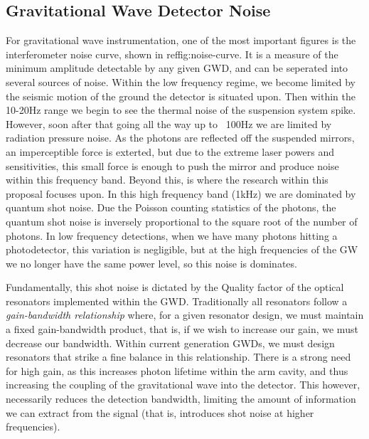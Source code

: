 \documentclass[aps,
                pra,  
                a4paper, 
                amsmath, 
                amssymb, 
                preprint,
                amsfonts,
                nofootinbib,
                titlepage
            ]{revtex4-2}
\begin{document}
    \subsection{Gravitational Wave Detector Noise}
    \label{sec:gwd-noise}
    For gravitational wave instrumentation, one of the most important figures is the interferometer noise curve, shown in ref{fig:noise-curve}. It is a measure of the minimum amplitude detectable by any given GWD, and can be seperated into several sources of noise. Within the low frequency regime, we become limited by the seismic motion of the ground the detector is situated upon. Then within the 10-20Hz range we begin to see the thermal noise of the suspension system spike. However, soon after that going all the way up to ~100Hz we are limited by radiation pressure noise. As the photons are reflected off the suspended mirrors, an imperceptible force is exterted, but due to the extreme laser powers and sensitivities, this small force is enough to push the mirror and produce noise within this frequency band. Beyond this, is where the research within this proposal focuses upon. In this high frequency band (1kHz) we are dominated by quantum shot noise. Due the Poisson counting statistics of the photons, the quantum shot noise is inversely proportional to the square root of the number of photons. In low frequency detections, when we have many photons hitting a photodetector, this variation is negligible, but at the high frequencies of the GW we no longer have the same power level, so this noise is dominates. 
    \par
    Fundamentally, this shot noise is dictated by the Quality factor of the optical resonators implemented within the GWD. Traditionally all resonators follow a \textit{gain-bandwidth relationship} where, for a given resonator design, we must maintain a fixed gain-bandwidth product, that is, if we wish to increase our gain, we must decrease our bandwidth. Within current generation GWDs, we must design resonators that strike a fine balance in this relationship. There is a strong need for high gain, as this increases photon lifetime within the arm cavity, and thus increasing the coupling of the gravitational wave into the detector. This however, necessarily reduces the detection bandwidth, limiting the amount of information we can extract from the signal (that is, introduces shot noise at higher frequencies).  
\end{document}

